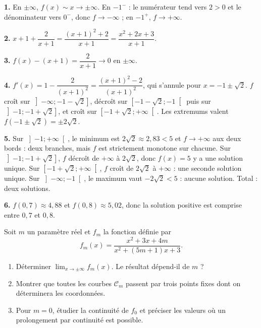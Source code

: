 \begin{corrige}
\textbf{1.} En $\pm\infty$, $f(x) \sim x \to \pm\infty$. En $-1^{-}$ :
le numérateur tend vers $2 > 0$ et le dénominateur vers $0^{-}$, donc
$f \to -\infty$ ; en $-1^{+}$, $f \to +\infty$.

\textbf{2.} $x + 1 + \dfrac{2}{x+1} = \dfrac{(x+1)^{2} + 2}{x+1}
= \dfrac{x^{2}+2x+3}{x+1}$.

\textbf{3.} $f(x) - (x+1) = \dfrac{2}{x+1} \to 0$ en $\pm\infty$.

\textbf{4.} $f'(x) = 1 - \dfrac{2}{(x+1)^{2}} = \dfrac{(x+1)^{2}-2}{(x+1)^{2}}$,
qui s'annule pour $x = -1 \pm \sqrt{2}$. $f$ croît sur
$\left]-\infty ; -1-\sqrt{2}\right]$, décroît sur
$\left[-1-\sqrt{2} ; -1\right[$ puis sur $\left]-1 ; -1+\sqrt{2}\right]$, et
croît sur $\left[-1+\sqrt{2} ; +\infty\right[$. Les extremums valent
$f(-1\pm\sqrt{2}) = \pm 2\sqrt{2}$.

\textbf{5.} Sur $\left]-1 ; +\infty\right[$, le minimum est $2\sqrt{2} \approx 2{,}83 < 5$
et $f \to +\infty$ aux deux bords : deux branches, mais $f$ est strictement
monotone sur chacune. Sur $\left]-1 ; -1+\sqrt{2}\right]$, $f$ décroît de
$+\infty$ à $2\sqrt{2}$, donc $f(x)=5$ y a une solution unique. Sur
$\left[-1+\sqrt{2} ; +\infty\right[$, $f$ croît de $2\sqrt{2}$ à $+\infty$ :
une seconde solution unique. Sur $\left]-\infty ; -1\right[$, le maximum vaut
$-2\sqrt{2} < 5$ : aucune solution. Total : deux solutions.

\textbf{6.} $f(0{,}7) \approx 4{,}88$ et $f(0{,}8) \approx 5{,}02$, donc la
solution positive est comprise entre $0{,}7$ et $0{,}8$.
\end{corrige}

\begin{concours}
Soit $m$ un paramètre réel et $f_{m}$ la fonction définie par
\[
  f_{m}(x) = \frac{x^{2} + 3x + 4m}{x^{2} + (5m+1)x + 3}.
\]

\begin{enumerate}[label=\textbf{\arabic*.}, leftmargin=*, itemsep=0.25em]
  \item Déterminer $\lim_{x \to \pm\infty} f_{m}(x)$. Le résultat dépend-il
        de $m$ ?
  \item Montrer que toutes les courbes $\mathscr{C}_{m}$ passent par trois
        points fixes dont on déterminera les coordonnées.
  \item Pour $m = 0$, étudier la continuité de $f_{0}$ et préciser les valeurs
        où un prolongement par continuité est possible.
\end{enumerate}
\end{concours}

